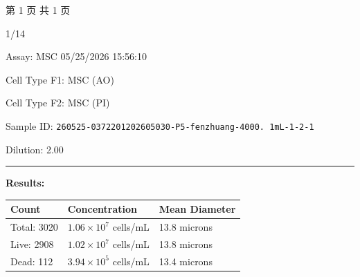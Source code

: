 \documentclass[UTF8,10pt,a4paper,fontset=fandol]{ctexart}
\newcommand{\fieldvalue}[1]{#1}
\newcommand{\handwritten}[1]{#1}
\begin{document}
\vfill
\begin{center}
第 1 页 共 1 页
\end{center}

\handwritten{1/14}

\newpage

\noindent
Assay: \fieldvalue{MSC}
\hfill
\fieldvalue{05/25/2026 15:56:10}

\medskip

Cell Type F1:
\fieldvalue{MSC (AO)}

\noindent
Cell Type F2:
\fieldvalue{MSC (PI)}

\medskip

Sample ID:
\fieldvalue{\texttt{260525-0372201202605030-P5-fenzhuang-4000. 1mL-1-2-1}}

\noindent
Dilution:
\fieldvalue{2.00}

\bigskip
\hrule
\bigskip

\noindent\textbf{Results:}

\medskip

\noindent
\begin{tabularx}{\textwidth}{@{}X X X@{}}
\textbf{Count} & \textbf{Concentration} & \textbf{Mean Diameter} \\
\hline
Total:
\fieldvalue{3020}
&
\fieldvalue{$1.06\times10^{7}$ cells/mL}
&
\fieldvalue{13.8 microns}
\\
Live:
\fieldvalue{2908}
&
\fieldvalue{$1.02\times10^{7}$ cells/mL}
&
\fieldvalue{13.8 microns}
\\
Dead:
\fieldvalue{112}
&
\fieldvalue{$3.94\times10^{5}$ cells/mL}
&
\fieldvalue{13.4 microns}
\end{tabularx}
\end{document}
